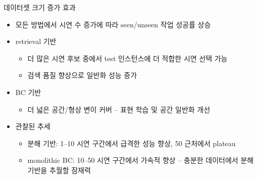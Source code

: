 \documentclass[aspectratio=169]{beamer}
\begin{document}
\begin{frame}{데이터셋 크기 증가 효과}
  \small
  \begin{itemize}
    \item 모든 방법에서 시연 수 증가에 따라 seen/unseen 작업 성공률 상승
    \item retrieval 기반
    \begin{itemize}
      \item 더 많은 시연 후보 중에서 test 인스턴스에 더 적합한 시연 선택 가능
      \item 검색 품질 향상으로 일반화 성능 증가
    \end{itemize}
    \item BC 기반
    \begin{itemize}
      \item 더 넓은 공간/형상 변이 커버 – 표현 학습 및 공간 일반화 개선
    \end{itemize}
    \item 관찰된 추세
    \begin{itemize}
      \item 분해 기반: 1–10 시연 구간에서 급격한 성능 향상, 50 근처에서 plateau
      \item monolithic BC: 10–50 시연 구간에서 가속적 향상 – 충분한 데이터에서 분해 기반을 추월할 잠재력
    \end{itemize}
  \end{itemize}
\end{frame}
\end{document}
